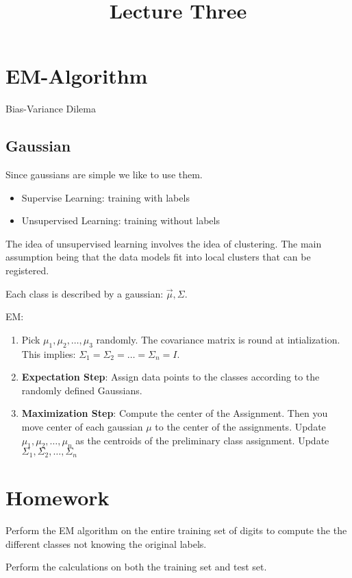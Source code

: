 \documentclass[letter, 9pt]{article}
\title{Lecture Three}
\begin{document}
\maketitle


\section{EM-Algorithm}
Bias-Variance Dilema

\subsection{Gaussian}
Since gaussians are simple we like to use them.

\begin{itemize}
\item Supervise Learning: training with labels
\item Unsupervised Learning: training without labels
\end{itemize}

The idea of unsupervised learning involves the idea of clustering. The main assumption being that the data models fit into local clusters that can be registered.

Each class is described by a gaussian: $\vec{\mu}, \Sigma$.

EM:
\begin{enumerate}
\item Pick $\mu_1, \mu_2, \dots, \mu_3$ randomly. The covariance matrix is round at intialization. This implies: $\Sigma_1 = \Sigma_2 = \dots = \Sigma_n = I$.
\item \textbf{Expectation Step}: Assign data points to the classes according to the randomly defined Gaussians.
\item \textbf{Maximization Step}: Compute the center of the Assignment. Then you move center of each gaussian $\mu$ to the center of the assignments. Update $\mu_1, \mu_2, \dots, \mu_n$ as the centroids of the preliminary class assignment. Update $\Sigma_1, \Sigma_2, \dots, \Sigma_n$
\end{enumerate}

\section{Homework}

Perform the EM algorithm on the entire training set of digits to compute the the different classes not knowing the original labels.

Perform the calculations on both the training set and test set.
\end{document}
